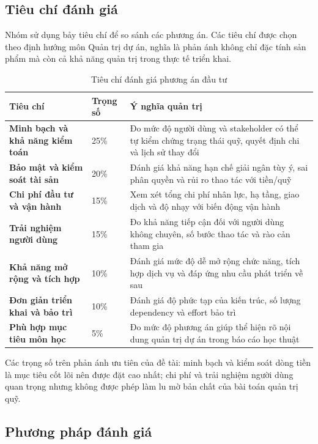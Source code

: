 \subsection{Tiêu chí đánh giá}

Nhóm sử dụng bảy tiêu chí để so sánh các phương án. Các tiêu chí được chọn theo định hướng môn Quản trị dự án, nghĩa là phản ánh không chỉ đặc tính sản phẩm mà còn cả khả năng quản trị trong thực tế triển khai.

\begin{table}[H]
\centering
\caption{Tiêu chí đánh giá phương án đầu tư}
\label{tab:investment-criteria}
\begin{tabularx}{\textwidth}{| >{\bfseries}p{4.2cm} | p{2.2cm} | X |}
\hline
Tiêu chí & Trọng số & Ý nghĩa quản trị \\
\hline
Minh bạch và khả năng kiểm toán & 25\% & Đo mức độ người dùng và stakeholder có thể tự kiểm chứng trạng thái quỹ, quyết định chi và lịch sử thay đổi \\ \hline
Bảo mật và kiểm soát tài sản & 20\% & Đánh giá khả năng hạn chế giải ngân tùy ý, sai phân quyền và rủi ro thao tác với tiền/quỹ \\ \hline
Chi phí đầu tư và vận hành & 15\% & Xem xét tổng chi phí nhân lực, hạ tầng, giao dịch và độ nhạy với biến động vận hành \\ \hline
Trải nghiệm người dùng & 15\% & Đo khả năng tiếp cận đối với người dùng không chuyên, số bước thao tác và rào cản tham gia \\ \hline
Khả năng mở rộng và tích hợp & 10\% & Đánh giá mức độ dễ mở rộng chức năng, tích hợp dịch vụ và đáp ứng nhu cầu phát triển về sau \\ \hline
Đơn giản triển khai và bảo trì & 10\% & Đánh giá độ phức tạp của kiến trúc, số lượng dependency và effort bảo trì \\ \hline
Phù hợp mục tiêu môn học & 5\% & Đo mức độ phương án giúp thể hiện rõ nội dung quản trị dự án trong báo cáo học thuật \\
\hline
\end{tabularx}
\end{table}

Các trọng số trên phản ánh ưu tiên của đề tài: minh bạch và kiểm soát dòng tiền là mục tiêu cốt lõi nên được đặt cao nhất; chi phí và trải nghiệm người dùng quan trọng nhưng không được phép làm lu mờ bản chất của bài toán quản trị quỹ.

\subsection{Phương pháp đánh giá}

